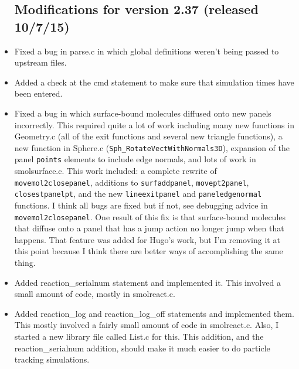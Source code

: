 \documentclass {scrbook}
\newcommand {\ttt} {\texttt}
\begin{document}
\begin{itemize}
\subsection{Modifications for version 2.37 (released 10/7/15)}
\item Fixed a bug in parse.c in which global definitions weren't being passed to upstream files.
\item Added a check at the cmd statement to make sure that simulation times have been entered.
\item Fixed a bug in which surface-bound molecules diffused onto new panels incorrectly. This required quite a lot of work including many new functions in Geometry.c (all of the exit functions and several new triangle functions), a new function in Sphere.c (\ttt{Sph\_RotateVectWithNormals3D}), expansion of the panel \ttt{points} elements to include edge normals, and lots of work in smolsurface.c. This work included: a complete rewrite of \ttt{movemol2closepanel}, additions to \ttt{surfaddpanel}, \ttt{movept2panel}, \ttt{closestpanelpt}, and the new \ttt{lineexitpanel} and \ttt{paneledgenormal} functions. I think all bugs are fixed but if not, see debugging advice in \ttt{movemol2closepanel}. One result of this fix is that surface-bound molecules that diffuse onto a panel that has a jump action no longer jump when that happens. That feature was added for Hugo's work, but I'm removing it at this point because I think there are better ways of accomplishing the same thing.
\item Added reaction\_serialnum statement and implemented it. This involved a small amount of code, mostly in smolreact.c.
\item Added reaction\_log and reaction\_log\_off statements and implemented them. This mostly involved a fairly small amount of code in smolreact.c. Also, I started a new library file called List.c for this. This addition, and the reaction\_serialnum addition, should make it much easier to do particle tracking simulations.


\end{itemize}
\end{document}
